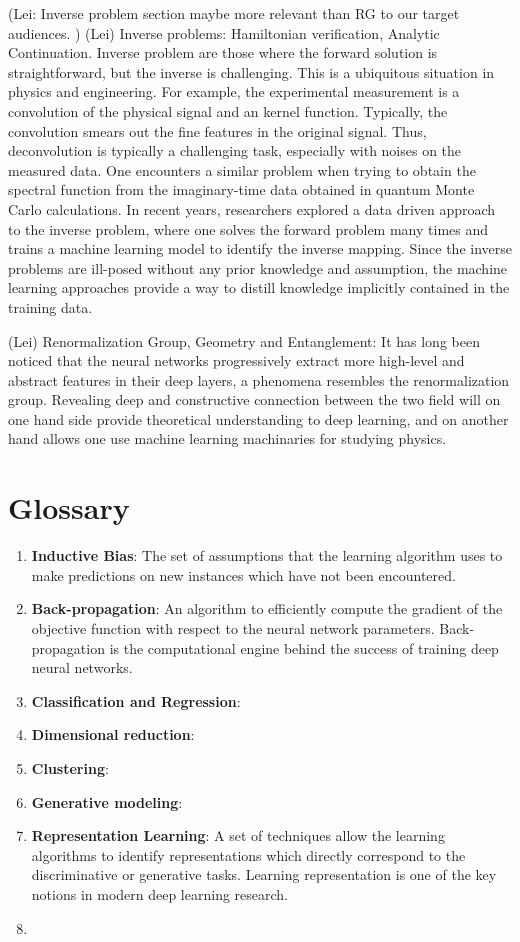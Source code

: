 \documentclass[aps,prb,floatfix,amsmath,amssymb,amsfonts,10pt,floatfix,longbibliography]{revtex4-1}
\begin{document}
\begin{enumerate}
(Lei: Inverse problem section maybe more relevant than RG to our target audiences. )
(Lei) Inverse problems:  Hamiltonian verification, Analytic Continuation.
Inverse problem are those where the forward solution is straightforward, but the inverse is challenging. This is a ubiquitous situation in physics and engineering. For example, the experimental measurement is a convolution of the physical signal and an kernel function. Typically, the convolution smears out the fine features in the original signal. 
Thus, deconvolution is typically a challenging task, especially with noises on the measured data. One encounters a similar problem when trying to obtain the spectral function from the imaginary-time data obtained in quantum Monte Carlo calculations. In recent years, researchers explored a data driven approach to the inverse problem, where one solves the forward problem many times and trains a machine learning model to identify the inverse mapping. Since the inverse problems are ill-posed without any prior knowledge and assumption, the machine learning approaches provide a way to distill knowledge implicitly contained in the training data. 

(Lei) Renormalization Group, Geometry and Entanglement: It has long been noticed that the neural networks progressively extract more high-level and abstract features in their deep layers, a phenomena resembles the renormalization group. Revealing deep and constructive connection between the two field will on one hand side provide theoretical understanding to deep learning, and on another hand allows one use machine learning machinaries for studying physics. 
	

\end{enumerate}
\section{Glossary}

\begin{enumerate}
    \item \textbf{Inductive Bias}: The set of assumptions that the learning algorithm uses to make predictions on new instances which have not been encountered.
    \item \textbf{Back-propagation}: An algorithm to efficiently compute the gradient of the objective function with respect to the neural network parameters. Back-propagation is the computational engine behind the success of training deep neural networks. 
    \item \textbf{Classification and Regression}:
    \item \textbf{Dimensional reduction}:
    \item \textbf{Clustering}:
    \item \textbf{Generative modeling}:
    \item \textbf{Representation Learning}: A set of techniques allow the learning algorithms to identify representations which directly correspond to the discriminative or generative tasks. 
    Learning representation is one of the key notions in modern deep learning research.  
    \item 
\end{enumerate}



\end{document}
